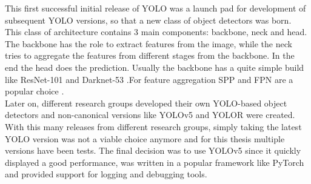This first successful initial release of YOLO was a launch pad for development of subsequent YOLO versions, so that a new class of object detectors was born. This class of architecture contains 3 main components: backbone, neck and head.
The backbone has the role to extract features from the image, while the neck tries to aggregate the features from different stages from the backbone. In the end the head does the prediction. Usually the backbone has a quite simple build like ResNet-101 and Darknet-53 \cite{yolov3_paper}.For feature aggregation SPP \cite{spp_paper} and FPN \cite{fpn_paper} are a popular choice . \\
Later on, different research groups developed their own YOLO-based object detectors and non-canonical versions like YOLOv5 \cite{yolov5_git} and YOLOR \cite{yolor_paper} were created. With this many releases from different research groups, simply taking the latest YOLO version was not a viable choice anymore and for this thesis multiple versions have been tests. The final decision was to use YOLOv5 since it quickly displayed a good performance, was written in a popular framework like PyTorch and provided support for logging and debugging tools.

